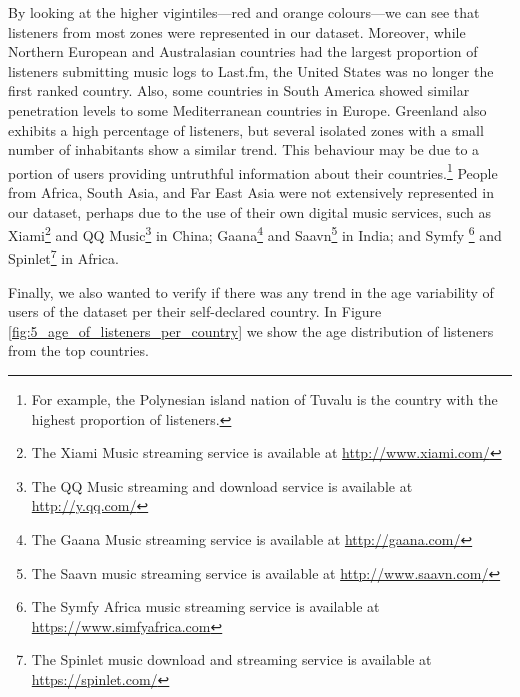 By looking at the higher vigintiles---red and orange colours---we can see that listeners from most zones were represented in our dataset. Moreover, while Northern European and Australasian countries had the largest proportion of listeners submitting music logs to Last.fm, the United States was no longer the first ranked country. Also, some countries in South America showed similar penetration levels to some Mediterranean countries in Europe.
Greenland also exhibits a high percentage of listeners, but several isolated zones with a small number of inhabitants show a similar trend. This behaviour may be due to a portion of users providing untruthful information about their countries.\footnote{For example, the Polynesian island nation of Tuvalu is the country with the highest proportion of listeners.}
People from Africa, South Asia, and Far East Asia were not extensively represented in our dataset, perhaps due to the use of their own digital music services, such as Xiami\footnote{The Xiami Music streaming service is available at \url{http://www.xiami.com/}} and QQ Music\footnote{The QQ Music streaming and download service is available at \url{http://y.qq.com/}} in China; Gaana\footnote{The Gaana Music streaming service is available at \url{http://gaana.com/}} and Saavn\footnote{The Saavn music streaming service is available at \url{http://www.saavn.com/}} in India; and Symfy \footnote{The Symfy Africa music streaming service is available at \url{https://www.simfyafrica.com}} and Spinlet\footnote{The Spinlet music download and streaming service is available at \url{https://spinlet.com/}} in Africa. 

Finally, we also wanted to verify if there was any trend in the age variability of users of the dataset per their self-declared country. In Figure \ref{fig:5_age_of_listeners_per_country} we show the age distribution of listeners from the top countries. 

